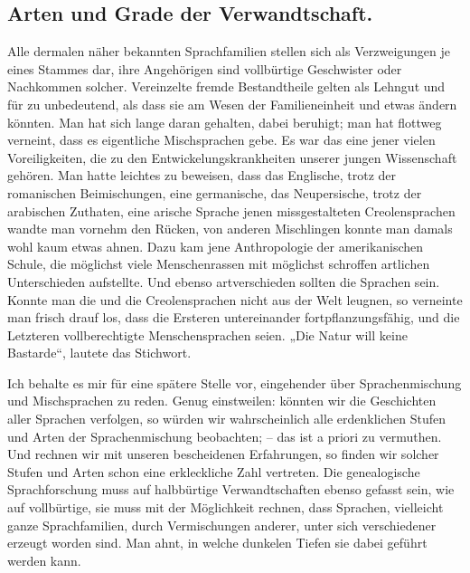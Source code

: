 \subsection*{Arten und Grade der Verwandtschaft.}
Alle dermalen näher bekannten Sprachfamilien stellen sich als Verzweigungen je eines Stammes dar, ihre Angehörigen sind vollbürtige Geschwister oder Nachkommen solcher. Vereinzelte fremde Bestandtheile gelten als Lehngut und für zu unbedeutend, als dass sie am Wesen der Familieneinheit und  etwas ändern könnten. Man hat sich lange daran gehalten, dabei beruhigt; man hat flottweg verneint, dass es eigent\label{fp.169}liche Mischsprachen gebe. Es war das eine jener vielen Voreiligkeiten, die zu den Entwickelungskrankheiten unserer jungen Wissenschaft gehören. Man hatte leichtes  zu beweisen, dass das Englische, trotz der romanischen Beimischungen, eine germanische, das Neupersische, trotz der arabischen Zuthaten, eine arische Sprache  jenen missgestalteten Creolensprachen wandte man vornehm den Rücken, von anderen Mischlingen konnte \label{sp.159} man damals wohl kaum etwas ahnen. Dazu kam jene Anthropologie der amerikanischen Schule, die möglichst viele Menschenrassen mit möglichst schroffen artlichen Unterschieden aufstellte. Und ebenso artverschieden sollten die Sprachen sein. Konnte man die  und die Creolensprachen nicht aus der Welt leugnen, so verneinte man frisch drauf los, dass die Ersteren untereinander fortpflanzungsfähig, und die Letzteren vollberechtigte Menschensprachen seien. „Die Natur will keine Bastarde“, lautete das Stichwort.

Ich behalte es mir für eine spätere Stelle vor, eingehender über Sprachenmischung und Mischsprachen zu reden. Genug einstweilen: könnten wir die Geschichten aller Sprachen verfolgen, so würden wir wahrscheinlich alle erdenklichen Stufen und Arten der Sprachenmischung beobachten; – das ist a priori zu vermuthen. Und rechnen wir mit unseren bescheidenen Erfahrungen, so finden wir solcher Stufen und Arten schon eine erkleckliche Zahl vertreten. Die genealogische Sprachforschung muss auf halbbürtige Verwandtschaften ebenso gefasst sein, wie auf vollbürtige, sie muss mit der Möglichkeit rechnen, dass Sprachen, vielleicht ganze Sprachfamilien, durch Vermischungen anderer, unter sich verschiedener erzeugt worden sind. Man ahnt, in welche dunkelen Tiefen sie dabei geführt werden kann.

